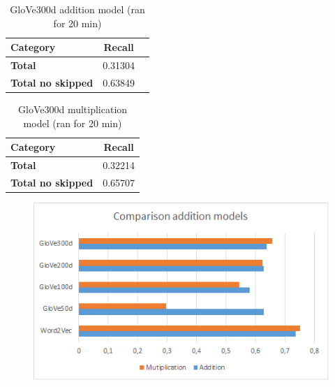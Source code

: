\begin{table}[h!]
	\centering
\begin{tabular}{| l | c | r}
    	\hline
    	\textbf{Category} &    \textbf{Recall}\\ \hline
    	\textbf{Total}				& 0.31304 \\
    	\textbf{Total no skipped}	& 0.63849 \\ \hline
\end{tabular}
\caption{GloVe300d addition model (ran for 20 min)}
\label{table:glove300d_addition}
\end{table}

\begin{table}[h!]
	\centering
\begin{tabular}{| l | c |}
    	\hline
    	\textbf{Category} 			& \textbf{Recall}\\ \hline
    	\textbf{Total}	  			& 0.32214 \\
    	\textbf{Total no skipped}	& 0.65707 \\ \hline
\end{tabular}
\caption{GloVe300d multiplication model (ran for 20 min)}
\label{table:glove300d_multiplication}
\end{table}

\begin{figure}[ht!]
\centering
\includegraphics[width=130mm]{images/chart1.png}
\caption{}
\end{figure}
